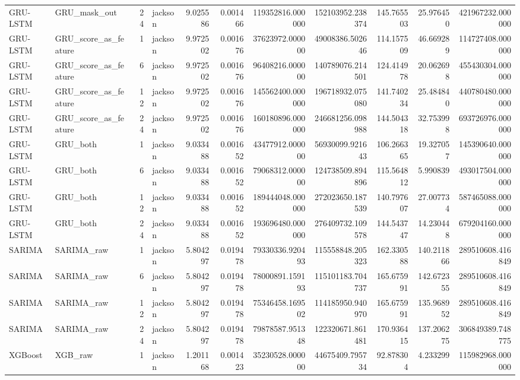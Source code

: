 \begin{longtable}{llrlrrrrrrr}
GRU-LSTM & GRU\_mask\_out & 24 & jackson & 9.025586 & 0.001466 & 119352816.000000 & 152103952.238374 & 145.765503 & 25.976450 & 421967232.000000 \\
GRU-LSTM & GRU\_score\_as\_feature & 1 & jackson & 9.972502 & 0.001676 & 37623972.000000 & 49008386.502646 & 114.157509 & 46.669289 & 114727408.000000 \\
GRU-LSTM & GRU\_score\_as\_feature & 6 & jackson & 9.972502 & 0.001676 & 96408216.000000 & 140789076.214501 & 124.414978 & 20.062698 & 455430304.000000 \\
GRU-LSTM & GRU\_score\_as\_feature & 12 & jackson & 9.972502 & 0.001676 & 145562400.000000 & 196718932.075080 & 141.740234 & 25.484840 & 440780480.000000 \\
GRU-LSTM & GRU\_score\_as\_feature & 24 & jackson & 9.972502 & 0.001676 & 160180896.000000 & 246681256.098988 & 144.504318 & 32.753998 & 693726976.000000 \\
GRU-LSTM & GRU\_both & 1 & jackson & 9.033488 & 0.001652 & 43477912.000000 & 56930099.921643 & 106.266365 & 19.327057 & 145390640.000000 \\
GRU-LSTM & GRU\_both & 6 & jackson & 9.033488 & 0.001652 & 79068312.000000 & 124738509.894896 & 115.564812 & 5.990839 & 493017504.000000 \\
GRU-LSTM & GRU\_both & 12 & jackson & 9.033488 & 0.001652 & 189444048.000000 & 272023650.187539 & 140.797607 & 27.007734 & 587465088.000000 \\
GRU-LSTM & GRU\_both & 24 & jackson & 9.033488 & 0.001652 & 193696480.000000 & 276409732.109578 & 144.543747 & 14.230448 & 679204160.000000 \\
SARIMA & SARIMA\_raw & 1 & jackson & 5.804297 & 0.019478 & 79330336.920493 & 115558848.205323 & 162.330588 & 140.211866 & 289510608.416849 \\
SARIMA & SARIMA\_raw & 6 & jackson & 5.804297 & 0.019478 & 78000891.159193 & 115101183.704737 & 165.675991 & 142.672355 & 289510608.416849 \\
SARIMA & SARIMA\_raw & 12 & jackson & 5.804297 & 0.019478 & 75346458.169502 & 114185950.940970 & 165.675991 & 135.968952 & 289510608.416849 \\
SARIMA & SARIMA\_raw & 24 & jackson & 5.804297 & 0.019478 & 79878587.951348 & 122320671.861481 & 170.936415 & 137.206275 & 306849389.748775 \\
XGBoost & XGB\_raw & 1 & jackson & 1.201168 & 0.001423 & 35230528.000000 & 44675409.795734 & 92.878304 & 4.233299 & 115982968.000000 \\

\end{longtable}
